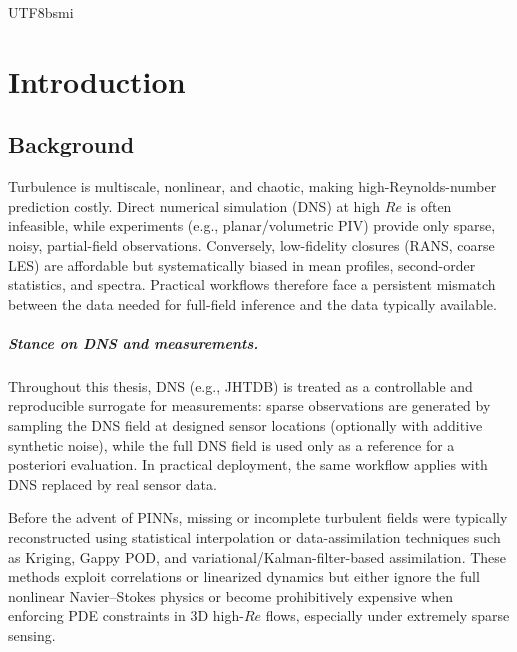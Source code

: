 \documentclass[master]{NTHUthesis}
\begin{document}
\begin{CJK*}{UTF8}{bsmi}

\chapter{Introduction}

\section{Background}
Turbulence is multiscale, nonlinear, and chaotic, making high-Reynolds-number prediction costly. Direct numerical simulation (DNS) at high $Re$ is often infeasible, while experiments (e.g., planar/volumetric PIV) provide only sparse, noisy, partial-field observations. Conversely, low-fidelity closures (RANS, coarse LES) are affordable but systematically biased in mean profiles, second-order statistics, and spectra. Practical workflows therefore face a persistent mismatch between the data needed for full-field inference and the data typically available.

\paragraph{Stance on DNS and measurements.}
Throughout this thesis, DNS (e.g., JHTDB) is treated as a controllable and reproducible surrogate for measurements: sparse observations are generated by sampling the DNS field at designed sensor locations (optionally with additive synthetic noise), while the full DNS field is used only as a reference for a posteriori evaluation. In practical deployment, the same workflow applies with DNS replaced by real sensor data.

Before the advent of PINNs, missing or incomplete turbulent fields were typically reconstructed using statistical interpolation or data-assimilation techniques such as Kriging, Gappy POD, and variational/Kalman-filter-based assimilation. These methods exploit correlations or linearized dynamics but either ignore the full nonlinear Navier--Stokes physics or become prohibitively expensive when enforcing PDE constraints in 3D high-$Re$ flows, especially under extremely sparse sensing.


\end{CJK*}
\end{document}
